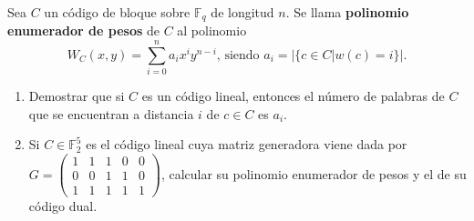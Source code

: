 \begin{formulationBox}
	Sea $C$ un código de bloque sobre $\mathbb{F}_q$ de longitud $n$. Se llama \textbf{polinomio enumerador de pesos} de $C$ al polinomio
	\[W_C(x, y) = \sum_{i=0}^{n} a_i x^i y^{n-i}\textrm{, siendo }a_i = |\{c\in C | w(c) = i\}|.\]
	
	\begin{enumerate}[label=\alph*)]
		\item Demostrar que si $C$ es un código lineal, entonces el número de palabras de $C$ que se encuentran a distancia $i$ de $c \in C$ es $a_i$.
		\item Si $C \in \mathbb{F}_2^5$ es el código lineal cuya matriz generadora viene dada por $G = \begin{pmatrix}
			1 & 1 & 1 & 0 & 0 \\
			0 & 0 & 1 & 1 & 0 \\
			1 & 1 & 1 & 1 & 1
		\end{pmatrix}$, calcular su polinomio enumerador de pesos y el de su código dual.
	\end{enumerate}
\end{formulationBox}

